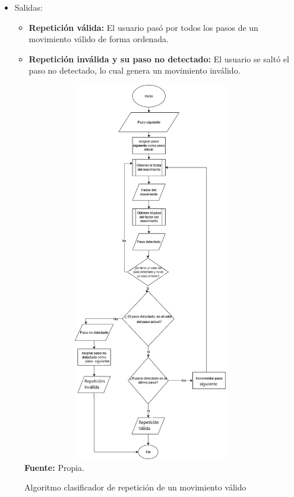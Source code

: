 \begin{itemize}
\begin{enumerate}[1.]
\item Finalizar algoritmo con repetici\'on v\'alida. %
\item Incrementar el paso siguiente y volver a obtener un nuevo fotograma del Kinect (saltar al proceso No. 2). %
\item Asignar el paso no detectado como paso siguiente.
\item Finalizar el algoritmo con repetici\'on inv\'alida.
\end{enumerate}
\item Salidas:
\begin{itemize}
\item \textbf{Repetici\'on v\'alida:} El usuario pas\'o por todos los pasos de un movimiento v\'alido de forma ordenada.
\item \textbf{Repetici\'on inv\'alida y su paso no detectado:} El usuario se salt\'o el paso no detectado, lo cual genera un movimiento inv\'alido.
\end{itemize}
\end{itemize}
\begin{figure}[H]
	\caption{Algoritmo clasificador de repetici\'on de un movimiento v\'alido }
	\label{fig:capturaDatos}
	\centering
	\includegraphics[width=430px,height=630px]{graphics/flujoGramaRepiticion.png} \\
	\textbf{Fuente:} Propia.
\end{figure}
